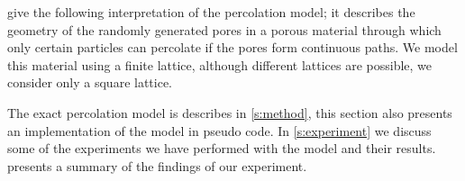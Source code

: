 \noindent \textcite{kenzel1997physics} give the following interpretation of the percolation model; it describes the geometry of the randomly generated pores in a porous material through which only certain particles can percolate if the pores form continuous paths. We model this material using a finite lattice, although different lattices are possible, we consider only a square lattice. 

The exact percolation model is describes in \cref{s:method}, this section also presents an implementation of the model in pseudo code. In \cref{s:experiment} we discuss some of the experiments we have performed with the model and their results.  presents a summary of the findings of our experiment. 

